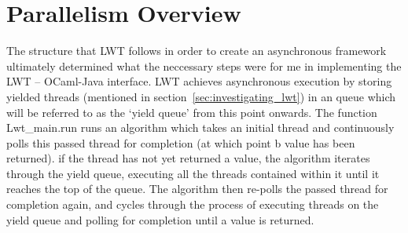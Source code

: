 \documentclass[12pt,twoside,notitlepage]{report}
\begin{document}
\section{Parallelism Overview}
\label{sec:parallelism_overview}
%
%
The structure that LWT follows in order to create an asynchronous framework ultimately determined what the neccessary steps were for me in implementing the LWT -- OCaml-Java interface. LWT achieves asynchronous execution by storing
yielded threads (mentioned in section~\ref{sec:investigating_lwt}) in an queue which will be referred to as the `yield queue' from this point onwards. The function Lwt\_main.run runs an algorithm which takes an initial thread and
continuously polls this passed thread for completion (at which point b value has been returned). if the thread has not yet returned a value, the algorithm iterates through the yield queue, executing all the threads contained within it
until it reaches the top of the queue. The algorithm then re-polls the passed thread for completion again, and cycles through the process of executing threads on the yield queue and polling for completion until a value is returned. 
\end{document}
